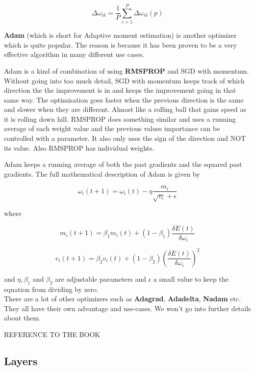 \[ \Delta\omega_{ik} = \frac{1}{P}  \displaystyle\sum_{i=1}^{P} \Delta\omega_{ik}(p) \]

\textbf{Adam} (which is short for Adaptive moment estimation) is another optimizer which is quite popular.
The reason is because it has been proven to be a very effective algorithm in many different use cases.

Adam is a kind of combination of using \textbf{RMSPROP} and SGD with momentum.
Without going into too much detail, SGD with momentum keeps track of which direction the the improvement is in and keeps the improvement going in that same way. The optimisation goes faster when the previous direction is the same and slower when they are different. Almost like a rolling ball that gains speed as it is rolling down hill.
RMSPROP does something similar and uses a running average of each weight value and the previous values importance can be controlled with a parameter. It also only uses the sign of the direction and NOT its value. Also RMSPROP has individual weights.

Adam keeps a running average of both the past gradients and the squared past gradients.
The full mathematical description of Adam is given by

\[ \omega_i (t+1) = \omega_i(t) - \eta \frac{m_i}{\sqrt{v_i} + \epsilon} \]

where

\[ m_i (t+1) = \beta_1m_i(t) + (1 - \beta_1) \frac{ \delta E(t) }{\delta\omega_i} \]

\[ v_i (t+1) = \beta_2v_i(t) + (1 - \beta_2) (\frac{ \delta E(t) }{\delta\omega_i})^2 \]

and $ \eta, \beta_1 $ and $ \beta_2 $ are adjustable parameters and $ \epsilon $ a small value to keep the equation from dividing by zero.\\

There are a lot of other optimizers such as \textbf{Adagrad}, \textbf{Adadelta}, \textbf{Nadam} etc. They all have their own advantage and use-cases. We won't go into further details about them.

REFERENCE TO THE BOOK

\subsection{Layers}

